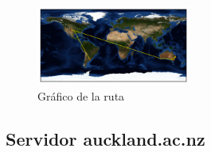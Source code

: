 \begin{figure}[H]
  \centering
    \includegraphics[width=0.45\textwidth]{grafico-rutas/www-uq-edu-au.png}
  \caption{Gráfico de la ruta}
  \label{entropia-s}
\end{figure}





\subsection{Servidor auckland.ac.nz}

